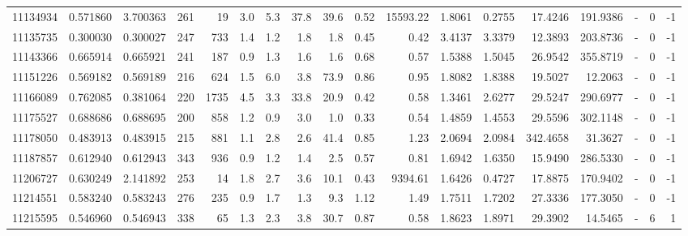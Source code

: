\begin{tabular}{rrrrrrrrrrrrrrrlrr}
  11134934 & 0.571860 &   3.700363 &  261 &   19 &      3.0 &      5.3 &    37.8 &     39.6 &       0.52 &    15593.22 &  1.8061 &  0.2755 &   17.4246 &  191.9386 &             - &        0 &         -1 \\
  11135735 & 0.300030 &   0.300027 &  247 &  733 &      1.4 &      1.2 &     1.8 &      1.8 &       0.45 &        0.42 &  3.4137 &  3.3379 &   12.3893 &  203.8736 &             - &        0 &         -1 \\
  11143366 & 0.665914 &   0.665921 &  241 &  187 &      0.9 &      1.3 &     1.6 &      1.6 &       0.68 &        0.57 &  1.5388 &  1.5045 &   26.9542 &  355.8719 &             - &        0 &         -1 \\
  11151226 & 0.569182 &   0.569189 &  216 &  624 &      1.5 &      6.0 &     3.8 &     73.9 &       0.86 &        0.95 &  1.8082 &  1.8388 &   19.5027 &   12.2063 &             - &        0 &         -1 \\
  11166089 & 0.762085 &   0.381064 &  220 & 1735 &      4.5 &      3.3 &    33.8 &     20.9 &       0.42 &        0.58 &  1.3461 &  2.6277 &   29.5247 &  290.6977 &             - &        0 &         -1 \\
  11175527 & 0.688686 &   0.688695 &  200 &  858 &      1.2 &      0.9 &     3.0 &      1.0 &       0.33 &        0.54 &  1.4859 &  1.4553 &   29.5596 &  302.1148 &             - &        0 &         -1 \\
  11178050 & 0.483913 &   0.483915 &  215 &  881 &      1.1 &      2.8 &     2.6 &     41.4 &       0.85 &        1.23 &  2.0694 &  2.0984 &  342.4658 &   31.3627 &             - &        0 &         -1 \\
  11187857 & 0.612940 &   0.612943 &  343 &  936 &      0.9 &      1.2 &     1.4 &      2.5 &       0.57 &        0.81 &  1.6942 &  1.6350 &   15.9490 &  286.5330 &             - &        0 &         -1 \\
  11206727 & 0.630249 &   2.141892 &  253 &   14 &      1.8 &      2.7 &     3.6 &     10.1 &       0.43 &     9394.61 &  1.6426 &  0.4727 &   17.8875 &  170.9402 &             - &        0 &         -1 \\
  11214551 & 0.583240 &   0.583243 &  276 &  235 &      0.9 &      1.7 &     1.3 &      9.3 &       1.12 &        1.49 &  1.7511 &  1.7202 &   27.3336 &  177.3050 &             - &        0 &         -1 \\
  11215595 & 0.546960 &   0.546943 &  338 &   65 &      1.3 &      2.3 &     3.8 &     30.7 &       0.87 &        0.58 &  1.8623 &  1.8971 &   29.3902 &   14.5465 &             - &        6 &          1 \\

\end{tabular}
